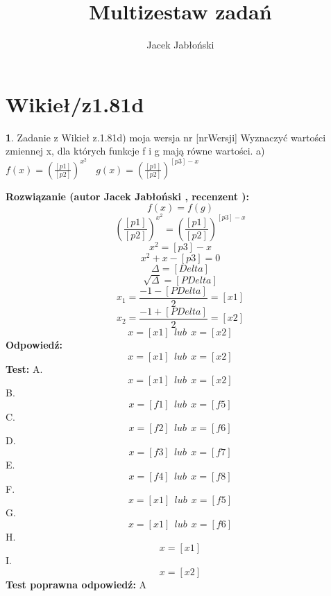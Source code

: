 \documentclass[12pt, a4paper]{article}
\title{Multizestaw zadań}
\author{Jacek Jabłoński}
\date{}
\theoremstyle{definition} %
\newtheorem{zad}{}
\newcommand{\kategoria}[1]{\section{#1}} %
\newcommand{\zadStart}[1]{\begin{zad}#1\newline} %
\newcommand{\zadStop}{\end{zad}}   %
\newcommand{\rozwStart}[2]{\noindent \textbf{Rozwiązanie (autor #1 , recenzent #2): }\newline} %
\newcommand{\rozwStop}{\newline}                                            %
\newcommand{\odpStart}{\noindent \textbf{Odpowiedź:}\newline}    %
\newcommand{\odpStop}{\newline}                                             %
\newcommand{\testStart}{\noindent \textbf{Test:}\newline} %
\newcommand{\testStop}{\newline} %
\newcommand{\kluczStart}{\noindent \textbf{Test poprawna odpowiedź:}\newline} %
\newcommand{\kluczStop}{\newline} %
\begin{document}
\maketitle


\kategoria{Wikieł/z1.81d}
\zadStart{Zadanie z Wikieł z.1.81d) moja wersja nr [nrWersji]}
Wyznaczyć wartości zmiennej x, dla których funkcje f i g mają równe wartości.
a)$f(x)=(\frac{[p1]}{[p2]})^{x^2} \ \ \ \ g(x)=(\frac{[p1]}{[p2]})^{[p3]-x}$
\zadStop
\rozwStart{Jacek Jabłoński}{}
$$f(x)=f(g)$$
$$(\frac{[p1]}{[p2]})^{x^2} = (\frac{[p1]}{[p2]})^{[p3]-x}$$
$$x^2 = [p3]-x$$
$$x^2 + x - [p3] = 0$$
$$\Delta = [Delta] $$
$$\sqrt{\Delta} = [PDelta] $$
$$x_1 = \frac{-1-[PDelta]}{2} = [x1] $$
$$x_2 = \frac{-1+[PDelta]}{2} = [x2] $$
$$x = [x1] \ \ lub \ \ x = [x2]$$
\rozwStop
\odpStart
$$x = [x1] \ \ lub \ \ x = [x2]$$
\odpStop
\testStart
A. $$x = [x1] \ \ lub \ \ x = [x2]$$
B. $$x = [f1] \ \ lub \ \ x = [f5]$$
C. $$x = [f2] \ \ lub \ \ x = [f6]$$
D. $$x = [f3] \ \ lub \ \ x = [f7]$$
E. $$x = [f4] \ \ lub \ \ x = [f8]$$
F. $$x = [x1] \ \ lub \ \ x = [f5]$$
G. $$x = [x1] \ \ lub \ \ x = [f6]$$
H. $$x = [x1]$$
I. $$x = [x2]$$
\testStop
\kluczStart
A
\kluczStop
\end{document}
